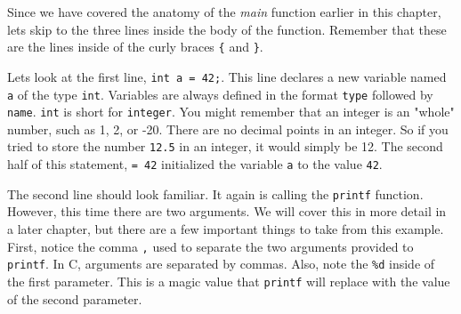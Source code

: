 \documentclass[12pt]{article}
\newcommand{\ident}[1]{{\it\ttfamily #1}}
\begin{document}
Since we have covered the anatomy of the \ident{main} function earlier in this
chapter, lets skip to the three lines inside the body of the function. Remember
that these are the lines inside of the curly braces \verb|{| and \verb|}|.

\begin{figure}
  \centering
  \def\svgwidth{100pt}
  
\end{figure}

Lets look at the first line, \verb|int a = 42;|. This line declares a new
variable named \verb|a| of the type \verb|int|. Variables are always
defined in the format \verb|type| followed by \verb|name|. \verb|int| is short
for \verb|integer|.  You might remember that an integer is an "whole" number,
such as 1, 2, or -20.  There are no decimal points in an integer. So if you
tried to store the number \verb|12.5| in an integer, it would simply be 12. The
second half of this statement, \verb|= 42| initialized the variable
\verb|a| to the value \verb|42|.

The second line should look familiar. It again is calling the \verb|printf|
function. However, this time there are two arguments. We will cover this in
more detail in a later chapter, but there are a few important things to take
from this example. First, notice the comma \verb|,| used to separate the
two arguments provided to \verb|printf|. In C, arguments are separated by
commas. Also, note the \verb|%d| inside of the first parameter. This is a
magic value that \verb|printf| will replace with the value of the second
parameter.
\end{document}

